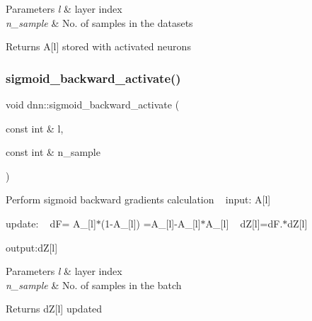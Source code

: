 \begin{DoxyParams}{Parameters}
{\em l} & layer index \\
\hline
{\em n\+\_\+sample} & No. of samples in the datasets \\
\hline
\end{DoxyParams}
\begin{DoxyReturn}{Returns}
A\mbox{[}l\mbox{]} stored with activated neurons 
\end{DoxyReturn}
\mbox{\label{classdnn_ad01dcf32fdb9321ad8396bafb0495f6b}} 
\subsubsection{\texorpdfstring{sigmoid\+\_\+backward\+\_\+activate()}{sigmoid\_backward\_activate()}}
{\footnotesize\ttfamily void dnn\+::sigmoid\+\_\+backward\+\_\+activate (\begin{DoxyParamCaption}\item[{const int \&}]{l,  }\item[{const int \&}]{n\+\_\+sample }\end{DoxyParamCaption})}

Perform sigmoid backward gradients calculation ~\newline
 input\+: A\mbox{[}l\mbox{]} ~\newline


update\+: ~\newline
 dF= A\+\_\+\mbox{[}l\mbox{]}$\ast$(1-\/\+A\+\_\+\mbox{[}l\mbox{]}) =A\+\_\+\mbox{[}l\mbox{]}-\/\+A\+\_\+\mbox{[}l\mbox{]}$\ast$\+A\+\_\+\mbox{[}l\mbox{]} ~\newline
 dZ\mbox{[}l\mbox{]}=dF.$\ast$dZ\mbox{[}l\mbox{]} ~\newline


output\+:dZ\mbox{[}l\mbox{]} ~\newline
 
\begin{DoxyParams}{Parameters}
{\em l} & layer index \\
\hline
{\em n\+\_\+sample} & No. of samples in the batch \\
\hline
\end{DoxyParams}
\begin{DoxyReturn}{Returns}
dZ\mbox{[}l\mbox{]} updated 
\end{DoxyReturn}
\mbox{\label{classdnn_a9377e30990622d77b1ca09c1b1ab6f8a}} 

